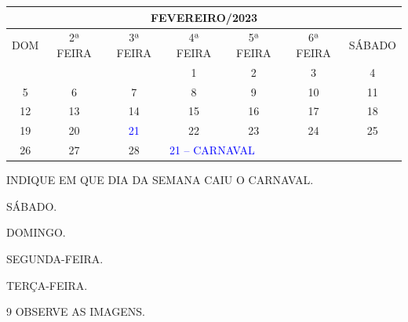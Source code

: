 \begin{table}[H]\footnotesize
\centering
\begin{tabular}{|ccccccc|}
\hline
\multicolumn{7}{|c|}{FEVEREIRO/2023} \\ \hline
\multicolumn{1}{|c|}{DOM} & \multicolumn{1}{c|}{2ª FEIRA} & \multicolumn{1}{c|}{3ª FEIRA} & \multicolumn{1}{c|}{4ª FEIRA} & \multicolumn{1}{c|}{5ª FEIRA} & \multicolumn{1}{c|}{6ª FEIRA} & SÁBADO \\ \hline
\multicolumn{1}{|c|}{} & \multicolumn{1}{c|}{} & \multicolumn{1}{c|}{} & \multicolumn{1}{c|}{1} & \multicolumn{1}{c|}{2} & \multicolumn{1}{c|}{3} & 4 \\ \hline
\multicolumn{1}{|c|}{5} & \multicolumn{1}{c|}{6} & \multicolumn{1}{c|}{7} & \multicolumn{1}{c|}{8} & \multicolumn{1}{c|}{9} & \multicolumn{1}{c|}{10} & 11 \\ \hline
\multicolumn{1}{|c|}{12} & \multicolumn{1}{c|}{13} & \multicolumn{1}{c|}{14} & \multicolumn{1}{c|}{15} & \multicolumn{1}{c|}{16} & \multicolumn{1}{c|}{17} & 18 \\ \hline
\multicolumn{1}{|c|}{19} & \multicolumn{1}{c|}{20} & \multicolumn{1}{c|}{\textcolor{blue}{21}} & \multicolumn{1}{c|}{22} & \multicolumn{1}{c|}{23} & \multicolumn{1}{c|}{24} & 25 \\ \hline
\multicolumn{1}{|c|}{26} & \multicolumn{1}{c|}{27} & \multicolumn{1}{c|}{28} & \multicolumn{4}{l|}{\textcolor{blue}{21 -- CARNAVAL}} \\ \hline
\end{tabular}\bigskip
\end{table}

INDIQUE EM QUE DIA DA SEMANA CAIU O CARNAVAL.

\begin{escolha}
\item SÁBADO.

\item DOMINGO.

\item SEGUNDA-FEIRA.

\item TERÇA-FEIRA.
\end{escolha}

\num{9} OBSERVE AS IMAGENS.


